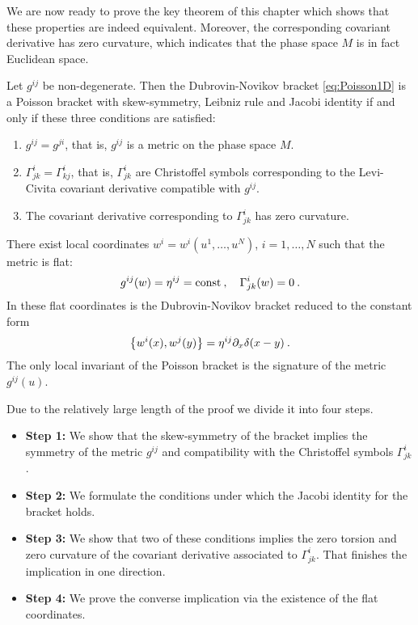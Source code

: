 We are now ready to prove the key theorem of this chapter which shows that these properties are indeed equivalent. Moreover, the corresponding covariant derivative has zero curvature, which indicates that the phase space $M$ is in fact Euclidean space.

\begin{theorem} \label{Theorem-Dubrovin-Novikov-1D}
    Let $g^{ij}$ be non-degenerate. Then the Dubrovin-Novikov bracket \eqref{eq:Poisson1D} is a Poisson bracket with skew-symmetry, Leibniz rule and Jacobi identity if and only if these three conditions are satisfied:
    \begin{enumerate}
        \item $g^{ij} = g^{ji}$, that is, $g^{ij}$ is a metric on the phase space $M$.
        \item $\Gamma^{i}_{jk} = \Gamma^i_{kj}$, that is, $\Gamma^{i}_{jk}$ are Christoffel symbols corresponding to the Levi-Civita covariant derivative compatible with $g^{ij}$.
        \item The covariant derivative corresponding to $\Gamma^{i}_{jk}$ has zero curvature.
    \end{enumerate}
\end{theorem}

\begin{corollary} \label{Corollary: existence of flat coordinates}
    There exist local coordinates $w^i = w^i(u^1, \dots, u^N)$, $i = 1, \dots, N$ such that the metric is flat:
    \begin{align}
        g^{ij}(w) = \eta^{ij} = \mathrm{const} \:, \quad \Gamma^i_{jk} (w) = 0 \:.
    \end{align}
    In these flat coordinates is the Dubrovin-Novikov bracket reduced to the constant form
    \begin{align}
        \left \lbrace w^i(x),w^j(y) \right \rbrace = \eta^{ij} \partial_x \delta(x-y) \:.
    \end{align}
    The only local invariant of the Poisson bracket is the signature of the metric $g^{ij}(u)$.
\end{corollary}

Due to the relatively large length of the proof we divide it into four steps.
\begin{itemize}
    \item \textbf{Step 1:} We show that the skew-symmetry of the bracket implies the symmetry of the metric $g^{ij}$ and compatibility with the Christoffel symbols $\Gamma^i_{jk}$.
    \item \textbf{Step 2:} We formulate the conditions under which the Jacobi identity for the bracket holds.
    \item \textbf{Step 3:} We show that two of these conditions implies the zero torsion and zero curvature of the covariant derivative associated to $\Gamma^i_{jk}$. That finishes the implication in one direction.
    \item \textbf{Step 4:} We prove the converse implication via the existence of the flat coordinates.
\end{itemize}

